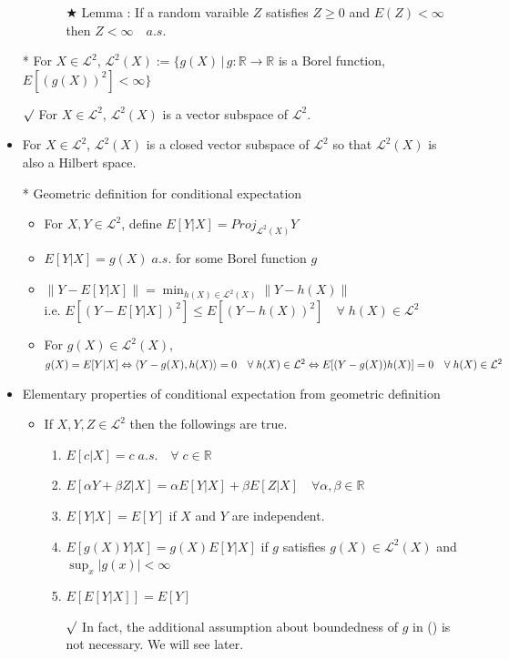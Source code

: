 \documentclass[12pt, A4]{article}
\newcommand{\rmk}{$\surd$}
\newcommand{\trick}{$\bigstar$}
\newcommand{\R}{\mathbb{R}}
\newcommand{\LL}{\mathcal{L}}
\begin{document}
\begin{itemize}
\begin{itemize}
		\begin{itemize}
			\item[\trick] Lemma : If a random varaible $Z$ satisfies $Z\geq 0$ and $E(Z)<\infty$ then $Z<\infty \quad a.s.$ 
		\end{itemize}
	\end{itemize}
	\item[*] For $X\in \LL^2$, \; $\LL^2(X):=\{g(X)\,|\, g:\R\rightarrow \R$ is a Borel function, $E[(g(X))^2]<\infty\}$
	\item[\rmk] For $X\in \LL^2$, \; $\LL^2(X)$ is a vector subspace of $\LL^2$.
	\item For $X\in \LL^2$, \; $\LL^2(X)$ is a closed vector subspace of $\LL^2$ so that $\LL^2(X)$ is also a Hilbert space. 
	\item[*] Geometric definition for conditional expectation
	\begin{itemize}
		\item For $X , Y\in \LL^2$, define $E[Y|X]=Proj_{\LL^2(X)}Y$
		\item $E[Y|X]=g(X)\; a.s.$ for some Borel function $g$
		\item $\|Y-E[Y|X]\|=\min_{h(X)\in \LL^2(X)}\|Y-h(X)\|$ \\ i.e. $E[(Y-E[Y|X])^2]\leq E[(Y-h(X))^2]\quad \forall\; h(X)\in \LL^2$
		\item For $g(X)\in \LL^2(X)$, \quad $g(X)=E[Y|X]\Leftrightarrow \langle Y-g(X), h(X)\rangle=0 \quad \forall\; h(X)\in \LL^2 \\ \Leftrightarrow E[(Y-g(X))h(X)]=0 \quad \forall \;h(X)\in \LL^2$
	\end{itemize} 
	\item Elementary properties of conditional expectation from geometric definition
	\begin{itemize}
		\item If $X, Y, Z\in \LL^2$ then the followings are true.
		\begin{enumerate}
			\item $E[c|X]=c\; a.s. \quad \forall \; c\in \R$
			\item $E[\alpha Y+\beta Z |X]=\alpha E[Y|X]+\beta E[Z|X]\quad \forall \alpha, \beta\in \R$
			\item $E[Y|X]=E[Y]$ if $X$ and $Y$ are independent.
			\item $E[g(X)Y|X]=g(X)E[Y|X]$ if $g$ satisfies $g(X)\in \LL^2(X)$ and $\sup_x |g(x)|<\infty$
			\item $E[E[Y|X]]=E[Y]$
			\item[\rmk] In fact, the additional assumption about boundedness of $g$ in () is not necessary. We will see later.

\end{enumerate}
\end{itemize}
\end{itemize}
\end{document}
